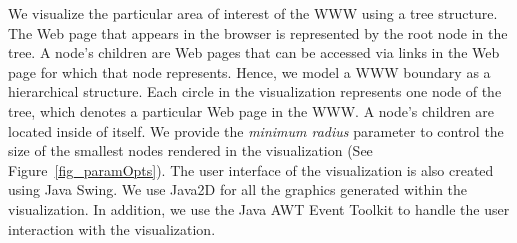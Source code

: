 \documentclass[10pt,psfig]{article}
\begin{document}
{%
We visualize the particular area of interest of the WWW using a tree structure.
The Web page that appears in the browser is represented by the root node in the tree.
A node's children are Web pages that can be accessed via links in the Web page for which that node represents.
Hence, we model a WWW boundary as a hierarchical structure.
Each circle in the visualization represents one node of the tree, which denotes a particular Web page in the WWW.
A node's children are located inside of itself.
We provide the {\em minimum radius} parameter to control the size of the smallest nodes rendered in the visualization (See Figure~\ref{fig_paramOpts}).
The user interface of the visualization is also created using Java Swing.
We use Java2D for all the graphics generated within the visualization.
In addition, we use the Java AWT Event Toolkit to handle the user interaction with the visualization.




}
\end{document}
